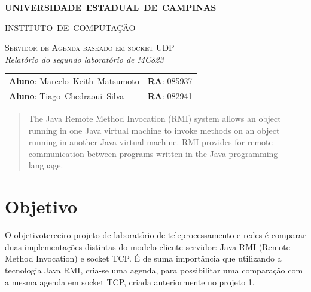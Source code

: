 \documentclass[10pt,a4paper]{article}
\begin{document}
\begin{titlepage}
  \thispagestyle{empty}
  \begin{center} {\large \textbf{UNIVERSIDADE~ESTADUAL~DE~CAMPINAS}} \end{center}
  \begin{center} {\large INSTITUTO~DE~COMPUTAÇÃO}                    \end{center}
  \vspace{0.1cm}
  \begin{center}
    \begin{minipage}[tl]{31mm}
    \end{minipage}
  \end{center}
  \vspace{0.3cm}
  \begin{center} 
    {\large \textsc{Servidor de Agenda baseado em socket UDP
      }} 
    \\\vspace{0.5cm}
    {\textsl{Relatório do segundo laboratório de MC823}}
    \\\vspace{1cm}
    \begin{tabular}{ll}
      \textbf{Aluno}:        Marcelo~Keith~Matsumoto   &  \textbf{RA}:       085937 \\
      \textbf{Aluno}:        Tiago~Chedraoui~Silva    &   \textbf{RA}:       082941 \\
      
    \end{tabular}
  \end{center}
  \vspace{0.5cm}

  \begin{abstract}

The Java Remote Method Invocation (RMI) system allows an object running in one Java virtual machine to invoke methods on an object running in another Java virtual machine. RMI provides for remote communication between programs written in the Java programming language.

  \end{abstract}

\end{titlepage} 
  \tableofcontents

\newpage


\section{Objetivo}
O objetivoterceiro projeto de laboratório de teleprocessamento e redes é
comparar duas implementações distintas do modelo cliente-servidor: Java
RMI (Remote Method Invocation) e socket TCP. 
É de suma importância que utilizando a tecnologia Java RMI, cria-se
uma agenda, para possibilitar uma comparação
com a mesma agenda em socket TCP, criada anteriormente no projeto 1.
\end{document}
